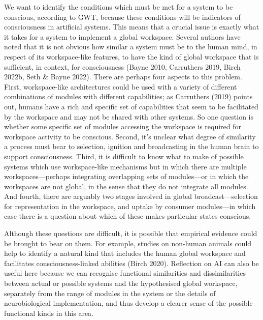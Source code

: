 \documentclass[12pt]{article}
\begin{document}
We want to identify the conditions which must be met for a system to be conscious, according to GWT, because these conditions will be indicators of consciousness in artificial systems. This means that a crucial issue is exactly what it takes for a system to implement a global workspace. Several authors have noted that it is not obvious how similar a system must be to the human mind, in respect of its workspace-like features, to have the kind of global workspace that is sufficient, in context, for consciousness (Bayne 2010, Carruthers 2019, Birch 2022b, Seth \& Bayne 2022). There are perhaps four aspects to this problem. First, workspace-like architectures could be used with a variety of different combinations of modules with different capabilities; as Carruthers (2019) points out, humans have a rich and specific set of capabilities that seem to be facilitated by the workspace and may not be shared with other systems. So one question is whether some specific set of modules accessing the workspace is required for workspace activity to be conscious. Second, it’s unclear what degree of similarity a process must bear to selection, ignition and broadcasting in the human brain to support consciousness. Third, it is difficult to know what to make of possible systems which use workspace-like mechanisms but in which there are multiple workspaces—perhaps integrating overlapping sets of modules—or in which the workspaces are not global, in the sense that they do not integrate all modules. And fourth, there are arguably two stages involved in global broadcast—selection for representation in the workspace, and uptake by consumer modules—in which case there is a question about which of these makes particular states conscious.

Although these questions are difficult, it is possible that empirical evidence could be brought to bear on them. For example, studies on non-human animals could help to identify a natural kind that includes the human global workspace and facilitates consciousness-linked abilities (Birch 2020). Reflection on AI can also be useful here because we can recognise functional similarities and dissimilarities between actual or possible systems and the hypothesised global workspace, separately from the range of modules in the system or the details of neurobiological implementation, and thus develop a clearer sense of the possible functional kinds in this area.
\end{document}
